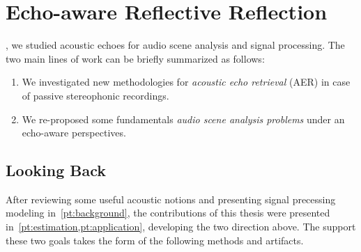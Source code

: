 \chapter{Echo-aware Reflective Reflection}\label{ch:conclusion}

\vspace{-2.5em}
, we studied acoustic echoes for audio scene analysis and signal processing.
The two main lines of work can be briefly summarized as follows:
\begin{enumerate}[label=\Alph*.]
    \item We investigated new methodologies for \textit{acoustic echo retrieval} (AER) in case of passive stereophonic recordings.
    \item We re-proposed some fundamentals \textit{audio scene analysis problems} under an echo-aware perspectives.
\end{enumerate}

\section{Looking Back}
After reviewing some useful acoustic notions and presenting signal precessing modeling in~\cref{pt:background}, the contributions of this thesis were presented in~\cref{pt:estimation,pt:application},
developing the two direction above. The support these two goals takes the form of the following methods and artifacts.


